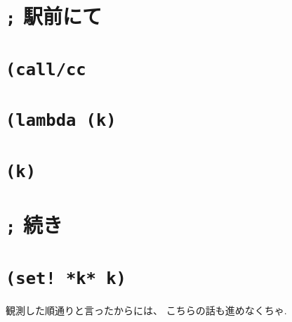 

\section*{\texttt{;} 駅前にて}


\section*{\texttt{(call/cc}}


\section*{\texttt{(lambda (k)}}


\section*{\texttt{(k)}}


\section*{\texttt{;} 続き}


\section*{\texttt{(set! *k* k)}}
観測した順通りと言ったからには、
こちらの話も進めなくちゃ.

